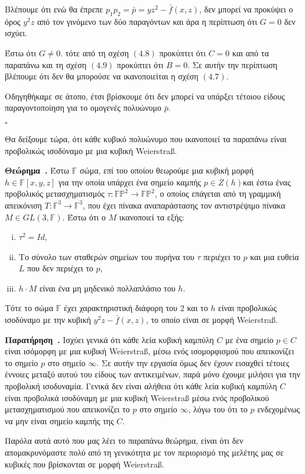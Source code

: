 \documentclass[12pt, a4paper]{book}
\newcounter{remark}[section]
\newenvironment{remark}[1][]{\refstepcounter{remark}\par\medskip
   \textbf{Παρατήρηση~\theremark. #1} \rmfamily}{\medskip}
\newcounter{theorem}[section]
\newenvironment{theorem}[1][]{\refstepcounter{theorem}\par\medskip
   \textbf{Θεώρημα~\thetheorem. #1} \rmfamily}{\medskip}
\begin{document}
Βλέπουμε ότι ενώ θα έπρεπε $p_1p_2=\bar{p} = yz^2 - \bar{f}(x,z)$, δεν μπορεί να προκύψει ο όρος $y^2z$ από τον γινόμενο των δύο παραγόντων και άρα η περίπτωση ότι $G=0$ δεν ισχύει.

Έστω ότι $G \neq 0$. τότε από τη σχέση $(4.8)$ προκύπτει ότι $C = 0$ και από τα παραπάνω και τη σχέση $(4.9)$ προκύπτει ότι $B=0$. Σε αυτήν την περίπτωση βλέπουμε ότι δεν θα μπορούσε να ικανοποιείται η σχέση $(4.7)$.

Οδηγηθήκαμε σε άτοπο, έτσι βρίσκουμε ότι δεν μπορεί να υπάρξει τέτοιου είδους παραγοντοποίηση για το ομογενές πολυώνυμο $\bar{p}$.
  \begin{flushright}
  $\square$
  \end{flushright}
  
Θα δείξουμε τώρα, ότι κάθε κυβικό πολυώνυμο που ικανοποιεί τα παραπάνω είναι προβολικώς ισοδύναμο με μια κυβική \textlatin{Weierstraß}.

\begin{theorem}
Έστω $\mathbb{F}$ σώμα, επί του οποίου θεωρούμε μια κυβική μορφή $h \in \mathbb{F}[x,y,z]$ για την οποία υπάρχει ένα σημείο καμπής $p \in Z(h)$και έστω ένας προβολικός μετασχηματισμός $τ: \mathbb{F}\mathbb{P}^2 \rightarrow \mathbb{F}\mathbb{P}^2$, ο οποίος επάγεται από τη γραμμική απεικόνιση $T:\mathbb{F}^3 \rightarrow \mathbb{F}^3$, που έχει πίνακα αναπαράστασης τον  αντιστρέψιμο πίνακα $M \in GL(3, \mathbb{F})$. Έστω ότι ο $M$ ικανοποιεί τα εξής:
\begin{enumerate}[(i)]
\item $τ^2 = Id$,
\item Το σύνολο των σταθερών σημείων του πυρήνα του $τ$ περιέχει το $p$ και μια ευθεία $L$ που δεν περιέχει το $p$,
\item $h\cdot M$ είναι ένα μη μηδενικό πολλαπλάσιο του $h$. 
\end{enumerate}

Τότε το σώμα $\mathbb{F}$ έχει χαρακτηριστική διάφορη του 2 και το $h$ είναι προβολικώς ισοδύναμο με την κυβική $y^2z-\bar{f}(x,z)$, το οποίο είναι σε μορφή \textlatin{Weierstraß}. 
\end{theorem}

\begin{remark}
Ισχύει γενικά ότι κάθε λεία κυβική καμπύλη $C$ με ένα σημείο $p \in C$ είναι ισόμορφη με μια κυβική \textlatin{Weierstraß}, μέσω ενός ισομορφισμού που απεικονίζει το σημείο $p$ στο σημείο $\infty$. Σε αυτήν την εργασία όμως δεν έχουν εισαχθεί τέτοιες έννοιες μεταξύ αυτού του είδους των αντικειμένων, παρά μόνο έχουμε μιλήσει για την προβολική ισοδυναμία. Γενικά δεν είναι αλήθεια ότι κάθε λεία κυβική καμπύλη $C$ είναι προβολικά ισοδύναμη με μια κυβική \textlatin{Weierstraß} μέσω ενός προβολικού μετασχηματισμού που απεικονίζει το $p$ στο σημείο $\infty$, λόγω του ότι το $p$ ενδεχομένως να μην είναι σημείο καμπής της $C$. 

Παρόλα αυτά αυτό που μας λέει το παραπάνω θεώρημα, είναι  ότι δεν απομακρυνόμαστε πολύ από τη γενικότητα με τον περιορισμό της μελέτης μας σε κυβικές που βρίσκονται σε μορφή \textlatin{Weierstraß}.
\end{remark}
\end{document}
